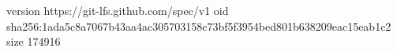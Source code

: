 version https://git-lfs.github.com/spec/v1
oid sha256:1ada5c8a7067b43aa4ac305703158c73bf5f3954bed801b638209eac15eab1c2
size 174916
